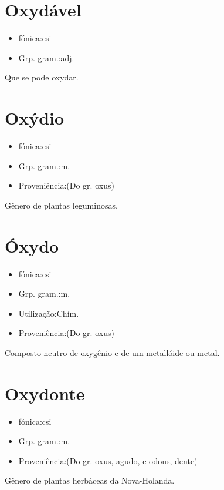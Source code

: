 \section{Oxydável}
\begin{itemize}
\item {fónica:csi}
\end{itemize}
\begin{itemize}
\item {Grp. gram.:adj.}
\end{itemize}
Que se pode oxydar.
\section{Oxýdio}
\begin{itemize}
\item {fónica:csi}
\end{itemize}
\begin{itemize}
\item {Grp. gram.:m.}
\end{itemize}
\begin{itemize}
\item {Proveniência:(Do gr. \textunderscore oxus\textunderscore )}
\end{itemize}
Gênero de plantas leguminosas.
\section{Óxydo}
\begin{itemize}
\item {fónica:csi}
\end{itemize}
\begin{itemize}
\item {Grp. gram.:m.}
\end{itemize}
\begin{itemize}
\item {Utilização:Chím.}
\end{itemize}
\begin{itemize}
\item {Proveniência:(Do gr. \textunderscore oxus\textunderscore )}
\end{itemize}
Composto neutro de oxygênio e de um metallóide ou metal.
\section{Oxydonte}
\begin{itemize}
\item {fónica:csi}
\end{itemize}
\begin{itemize}
\item {Grp. gram.:m.}
\end{itemize}
\begin{itemize}
\item {Proveniência:(Do gr. \textunderscore oxus\textunderscore , agudo, e \textunderscore odous\textunderscore , dente)}
\end{itemize}
Gênero de plantas herbáceas da Nova-Holanda.
